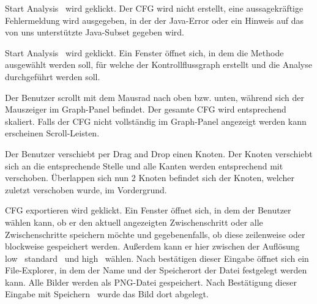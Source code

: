 {\glqq Start Analysis \grqq\ wird geklickt.}
{Der CFG wird nicht erstellt, eine aussagekräftige Fehlermeldung wird ausgegeben, in der der Java-Error oder ein Hinweis auf das von uns unterstützte Java-Subset gegeben wird.}

{\glqq Start Analysis \grqq\ wird geklickt.}
{Ein Fenster öffnet sich, in dem die Methode ausgewählt werden soll, für welche der Kontrollflussgraph erstellt und die Analyse durchgeführt werden soll.}



{Der Benutzer scrollt mit dem Mausrad nach oben bzw. unten, während sich der Mauszeiger im Graph-Panel befindet.}
{Der gesamte CFG wird entsprechend skaliert. Falls der CFG nicht vollständig im Graph-Panel angezeigt werden kann erscheinen Scroll-Leisten.}

{Der Benutzer verschiebt per \glqq Drag and Drop \grqq einen Knoten.}
{Der Knoten verschiebt sich an die entsprechende Stelle und alle Kanten werden entsprechend mit verschoben. Überlappen sich nun 2 Knoten befindet sich der Knoten, welcher zuletzt verschoben wurde, im Vordergrund.}


{\glqq CFG exportieren \grqq\. wird geklickt.}
{Ein Fenster öffnet sich, in dem der Benutzer wählen kann, ob er den aktuell angezeigten Zwischenschritt oder alle Zwischenschritte speichern möchte und gegebenenfalls, ob diese zeilenweise oder blockweise gespeichert werden. Außerdem kann er hier zwischen der Auflösung \glqq low \grqq\, \glqq standard \grqq\ und  \glqq  high \grqq\ wählen. Nach bestätigen dieser Eingabe öffnet sich ein File-Explorer, in dem der Name und der Speicherort der Datei festgelegt werden kann. Alle Bilder werden als PNG-Datei gespeichert. Nach Bestätigung dieser Eingabe mit  \glqq Speichern \grqq\ wurde das Bild dort abgelegt.}


